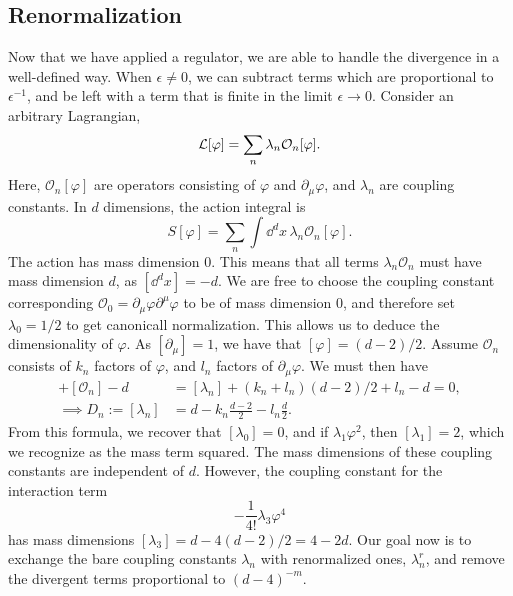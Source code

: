 \subsection*{Renormalization}

Now that we have applied a regulator, we are able to handle the divergence in a well-defined way.
When $\epsilon \neq 0$, we can subtract terms which are proportional to $\epsilon^{-1}$, and be left with a term that is finite in the limit $\epsilon \rightarrow 0$.
Consider an arbitrary Lagrangian, 
\begin{equation}
    \mathcal{L}[\varphi] = \sum_n \lambda_n \mathcal{O}_n[\varphi].
\end{equation}
Here, $\mathcal{O}_n[\varphi]$ are operators consisting of $\varphi$ and $\partial_\mu \varphi$, and $\lambda_n$ are coupling constants.
In $d$ dimensions, the action integral is
\begin{equation}
    S[\varphi] = \sum_n \int \dd^d x \, \lambda_n \mathcal{O}_n[\varphi].
\end{equation}
The action has mass dimension $0$.
This means that all terms $\lambda_n \mathcal O_n$ must have mass dimension $d$, as $[\dd^d x] = -d$.
We are free to choose the coupling constant corresponding $\mathcal O_0 = \partial_\mu \varphi \partial^\mu \varphi$ to be of mass dimension 0, and therefore set $\lambda_0 = 1/2$ to get canonicall normalization.
This allows us to deduce the dimensionality of $\varphi$.
As $[\partial_\mu] = 1$, we have that $[\varphi] = (d-2)/2$.
Assume $\mathcal O_n$ consists of $k_n$ factors of $\varphi$, and $l_n$ factors of $\partial_\mu \varphi$.
We must then have
\begin{align}
    [\lambda_n] + [\mathcal{O}_n] - d &= [\lambda_n] + (k_n + l_n)(d - 2) / 2 + l_n - d = 0, \\
    \implies D_n := [\lambda_n] &= d - k_n \frac{d - 2}{2} - l_n \frac{d}{2}.
\end{align}
From this formula, we recover that $[\lambda_0] = 0$, and if $\lambda_1 \varphi^2$, then $[\lambda_1] = 2$, which we recognize as the mass term squared.
The mass dimensions of these coupling constants are independent of $d$.
However, the coupling constant for the interaction term
\begin{equation}
    - \frac{1}{4!} \lambda_3 \varphi^4
\end{equation}
has mass dimensions $[\lambda_3] = d -4(d-2)/2 = 4 - 2d$.
Our goal now is to exchange the bare coupling constants $\lambda_n$ with renormalized ones, $\lambda_n^r$, and remove the divergent terms proportional to $(d - 4)^{-m}$.
